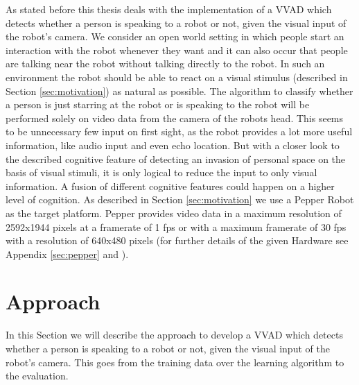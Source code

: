 As stated before this thesis deals with the implementation of a VVAD which detects whether a person is speaking to a robot or not, given the visual input of the robot's camera.
We consider an open world setting in which people start an interaction with the robot whenever they want and it can also occur that people are talking near the robot without talking directly to the robot.
In such an environment the robot should be able to react on a visual stimulus (described in Section \ref{sec:motivation}) as natural as possible.
The algorithm to classify whether a person is just starring at the robot or is speaking to the robot will be performed solely on video data from the camera of the robots head. This seems to be unnecessary few input on first sight, as the robot provides a lot more useful information, like audio input and even echo location. But with a closer look to the described cognitive feature of detecting an invasion of personal space on the basis of visual stimuli, it is only logical to reduce the input to only visual information. A fusion of different cognitive features could happen on a higher level of cognition.
As described in Section \ref{sec:motivation} we use a Pepper Robot as the target platform. Pepper provides video data in a maximum resolution of 2592x1944 pixels at a framerate of 1 fps or with a maximum framerate of 30 fps with a resolution of 640x480 pixels (for further details of the given Hardware see Appendix \ref{sec:pepper} and \cite{Pepper2018}).


\section{Approach}\label{sec:approach}
In this Section we will describe the approach to develop a VVAD which detects whether a person is speaking to a robot or not, given the visual input of the robot's camera. This goes from the training data over the learning algorithm to the evaluation.

